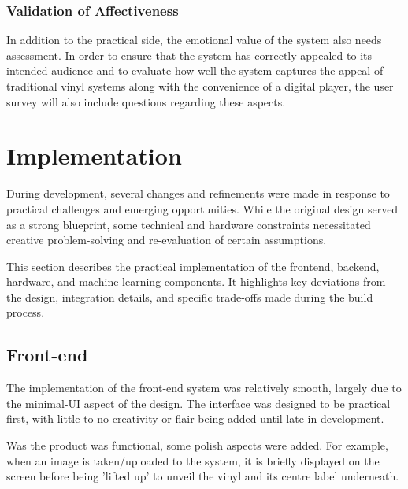             \subsubsection{Validation of Affectiveness}
                
                In addition to the practical side, the emotional value of the system also needs assessment. In order to ensure that the system has correctly appealed to its intended audience and to evaluate how well the system captures the appeal of traditional vinyl systems along with the convenience of a digital player, the user survey will also include questions regarding these aspects.
    
    \section{Implementation}
    
        During development, several changes and refinements were made in response to practical challenges and emerging opportunities. While the original design served as a strong blueprint, some technical and hardware constraints necessitated creative problem-solving and re-evaluation of certain assumptions.
    
        This section describes the practical implementation of the frontend, backend, hardware, and machine learning components. It highlights key deviations from the design, integration details, and specific trade-offs made during the build process.
    
        \subsection{Front-end}
    
    
            The implementation of the front-end system was relatively smooth, largely due to the minimal-UI aspect of the design. The interface was designed to be practical first, with little-to-no creativity or flair being added until late in development.
    
            Was the product was functional, some polish aspects were added. For example, when an image is taken/uploaded to the system, it is briefly displayed on the screen before being 'lifted up' to unveil the vinyl and its centre label underneath.
    
